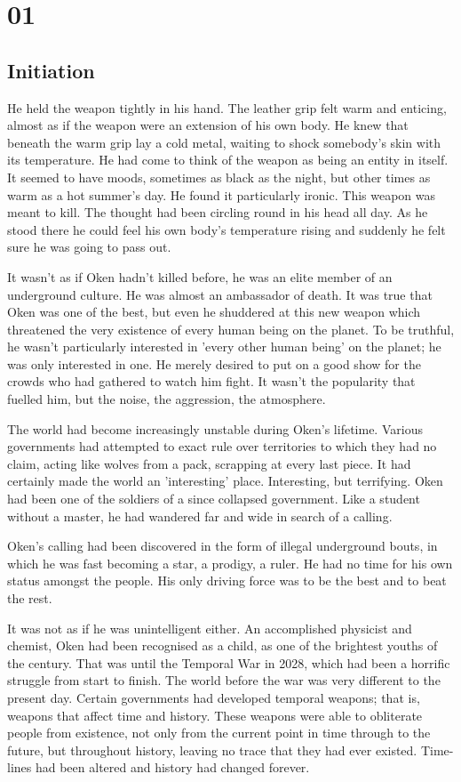 \chapter{01}
\section{Initiation}


He held the weapon tightly in his hand.  The leather grip felt warm and enticing, almost as if the weapon were an extension of his own body.  He knew that beneath the warm grip lay a cold metal, waiting to shock somebody's skin with its temperature.  He had come to think of the weapon as being an entity in itself.  It seemed to have moods, sometimes as black as the night, but other times as warm as a hot summer's day.  He found it particularly ironic.  This weapon was meant to kill.  The thought had been circling round in his head all day.  As he stood there he could feel his own body's temperature rising and suddenly he felt sure he was going to pass out.

It wasn't as if Oken hadn't killed before, he was an elite member of an underground culture.  He was almost an ambassador of death.  It was true that Oken was one of the best, but even he shuddered at this new weapon which threatened the very existence of every human being on the planet.  To be truthful, he wasn't particularly interested in 'every other human being' on the planet; he was only interested in one.  He merely desired to put on a good show for the crowds who had gathered to watch him fight.  It wasn't the popularity that fuelled him, but the noise, the aggression, the atmosphere.

The world had become increasingly unstable during Oken's lifetime.  Various governments had attempted to exact rule over territories to which they had no claim, acting like wolves from a pack, scrapping at every last piece.  It had certainly made the world an 'interesting' place.  Interesting, but terrifying.  Oken had been one of the soldiers of a since collapsed government.  Like a student without a master, he had wandered far and wide in search of a calling.  

Oken's calling had been discovered in the form of illegal underground bouts, in which he was fast becoming a star, a prodigy, a ruler.  He had no time for his own status amongst the people.  His only driving force was to be the best and to beat the rest.  

It was not as if he was unintelligent either.  An accomplished physicist and chemist, Oken had been recognised as a child, as one of the brightest youths of the century.  That was until the Temporal War in 2028, which had been a horrific struggle from start to finish.  The world before the war was very different to the present day.  Certain governments had developed temporal weapons; that is, weapons that affect time and history.  These weapons were able to obliterate people from existence, not only from the current point in time through to the future, but throughout history, leaving no trace that they had ever existed.  Time-lines had been altered and history had changed forever.  


